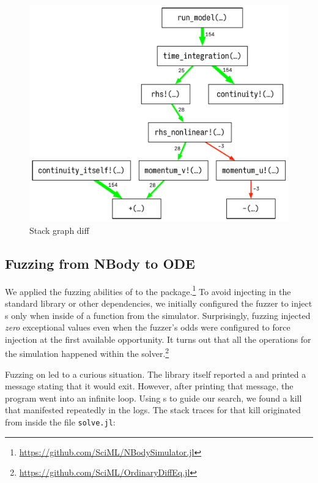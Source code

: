 \documentclass{juliacon}
\begin{document}
\begin{figure}[t]
  \centering
  \includegraphics[width=0.96\columnwidth]{./fig/cstg_diff_pretty.pdf}
  \caption{Stack graph diff}
  \label{fig:cstg_diff_demo}
\end{figure}


\subsection{Fuzzing from NBody to ODE}
\label{s:ode}

We applied the fuzzing abilities of \TF{} to the
\NBodySimulator{} package.\footnote{\url{https://github.com/SciML/NBodySimulator.jl}}
To avoid injecting in the standard library or other dependencies,
we initially configured the fuzzer to inject \NaN{}s {only} when inside of a
function from the simulator.
Surprisingly, fuzzing injected \emph{zero} exceptional values even
when the fuzzer's odds were configured to force injection at the
first available opportunity.
It turns out that all the \fp{} operations for the simulation happened
within the \OrdinaryDiffEq{}
solver.\footnote{\url{https://github.com/SciML/OrdinaryDiffEq.jl}}

Fuzzing on \OrdinaryDiffEq{} led to a curious situation.
The library itself reported a \NaN{} and printed a message stating that it would exit.
However, after printing that message, the program went into an infinite loop.
Using \CSTG{}s to guide our search, we found a \NaN{} kill that manifested repeatedly in the logs.
The stack traces for that kill originated from inside the file \texttt{solve.jl}:
\end{document}
